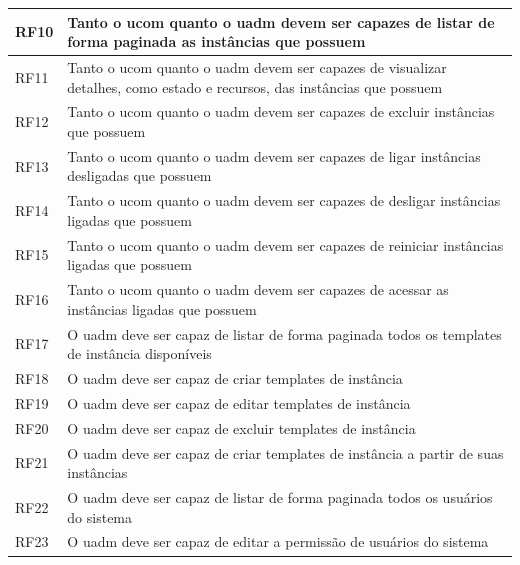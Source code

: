 \begin{longtable}{@{\extracolsep{\fill}}l p{}}
RF10 & Tanto o \gls{ucom} quanto o \gls{uadm} devem ser capazes de listar de forma paginada as instâncias que possuem \\ \hline

RF11 & Tanto o \gls{ucom} quanto o \gls{uadm} devem ser capazes de visualizar detalhes, como estado e recursos, das instâncias que possuem \\ \hline

RF12 & Tanto o \gls{ucom} quanto o \gls{uadm} devem ser capazes de excluir instâncias que possuem \\ \hline

RF13 & Tanto o \gls{ucom} quanto o \gls{uadm} devem ser capazes de ligar instâncias desligadas que possuem \\ \hline

RF14 & Tanto o \gls{ucom} quanto o \gls{uadm} devem ser capazes de desligar instâncias ligadas que possuem \\ \hline

RF15 & Tanto o \gls{ucom} quanto o \gls{uadm} devem ser capazes de reiniciar instâncias ligadas que possuem \\ \hline

RF16 & Tanto o \gls{ucom} quanto o \gls{uadm} devem ser capazes de acessar as instâncias ligadas que possuem \\ \hline

RF17 & O \gls{uadm} deve ser capaz de listar de forma paginada todos os templates de instância disponíveis \\ \hline

RF18 & O \gls{uadm} deve ser capaz de criar templates de instância \\ \hline

RF19 & O \gls{uadm} deve ser capaz de editar templates de instância \\ \hline

RF20 & O \gls{uadm} deve ser capaz de excluir templates de instância \\ \hline

RF21 & O \gls{uadm} deve ser capaz de criar templates de instância a partir de suas instâncias \\ \hline

RF22 & O \gls{uadm} deve ser capaz de listar de forma paginada todos os usuários do sistema \\ \hline

RF23 & O \gls{uadm} deve ser capaz de editar a permissão de usuários do sistema \\ \hline


\end{longtable}
